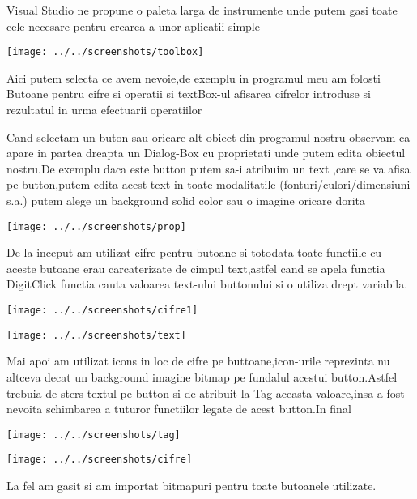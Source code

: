 Visual Studio ne propune o paleta larga de instrumente unde putem gasi toate cele necesare pentru crearea a unor aplicatii simple

\begin{center}
\texttt{[image: ../../screenshots/toolbox]}
\end{center}

Aici putem selecta ce avem nevoie,de exemplu in programul meu am folosti Butoane pentru cifre si operatii si textBox-ul afisarea cifrelor introduse si rezultatul in urma efectuarii operatiilor

Cand selectam un buton sau oricare alt obiect din programul nostru observam ca apare in partea dreapta un Dialog-Box cu proprietati unde putem edita obiectul nostru.De exemplu daca este button putem sa-i atribuim un text ,care se va afisa pe button,putem edita acest text in toate modalitatile (fonturi/culori/dimensiuni s.a.)
putem alege un background solid color sau o imagine oricare dorita
\begin{center}
\texttt{[image: ../../screenshots/prop]}
\end{center}

De la inceput am utilizat cifre pentru butoane si totodata toate functiile cu aceste butoane erau carcaterizate de cimpul text,astfel cand se apela functia DigitClick functia cauta valoarea text-ului buttonului si o utiliza drept variabila.

\begin{center}
\texttt{[image: ../../screenshots/cifre1]}
\end{center}


\begin{center}
\texttt{[image: ../../screenshots/text]}
\end{center}

Mai apoi am utilizat icons in loc de cifre pe buttoane,icon-urile reprezinta nu altceva decat un background imagine bitmap pe fundalul acestui button.Astfel trebuia de sters textul pe button si de atribuit la Tag aceasta valoare,insa a fost nevoita schimbarea a tuturor functiilor legate de acest button.In final 

\begin{center}
\texttt{[image: ../../screenshots/tag]}
\end{center}

\begin{center}
\texttt{[image: ../../screenshots/cifre]}
\end{center}
La fel am gasit si am importat bitmapuri pentru toate butoanele utilizate.


